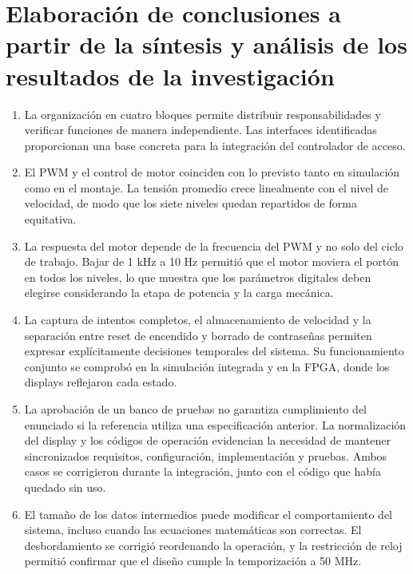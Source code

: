 \documentclass[12pt,letterpaper]{article}
\begin{document}

\section{Elaboración de conclusiones a partir de la síntesis
y análisis de los resultados de la investigación}

\begin{enumerate}
    \item La organización en cuatro bloques permite
    distribuir responsabilidades y verificar funciones
    de manera independiente. Las interfaces identificadas
    proporcionan una base concreta para la integración
    del controlador de acceso.

    \item El PWM y el control de motor coinciden con lo
    previsto tanto en simulación como en el montaje. La
    tensión promedio crece linealmente con el nivel de
    velocidad, de modo que los siete niveles quedan
    repartidos de forma equitativa.

    \item La respuesta del motor depende de la frecuencia
    del PWM y no solo del ciclo de trabajo. Bajar de 1 kHz
    a 10 Hz permitió que el motor moviera el portón en
    todos los niveles, lo que muestra que los parámetros
    digitales deben elegirse considerando la etapa de
    potencia y la carga mecánica.

    \item La captura de intentos completos, el
    almacenamiento de velocidad y la separación entre
    reset de encendido y borrado de contraseñas permiten
    expresar explícitamente decisiones temporales del
    sistema. Su funcionamiento conjunto se comprobó en la
    simulación integrada y en la FPGA, donde los displays
    reflejaron cada estado.

    \item La aprobación de un banco de pruebas no
    garantiza cumplimiento del enunciado si la referencia
    utiliza una especificación anterior. La normalización
    del display y los códigos de operación evidencian la
    necesidad de mantener sincronizados requisitos,
    configuración, implementación y pruebas. Ambos casos
    se corrigieron durante la integración, junto con el
    código que había quedado sin uso.

    \item El tamaño de los datos intermedios puede
    modificar el comportamiento del sistema, incluso
    cuando las ecuaciones matemáticas son correctas. El
    desbordamiento se corrigió reordenando la operación, y
    la restricción de reloj permitió confirmar que el
    diseño cumple la temporización a 50 MHz.


\end{enumerate}
\end{document}
